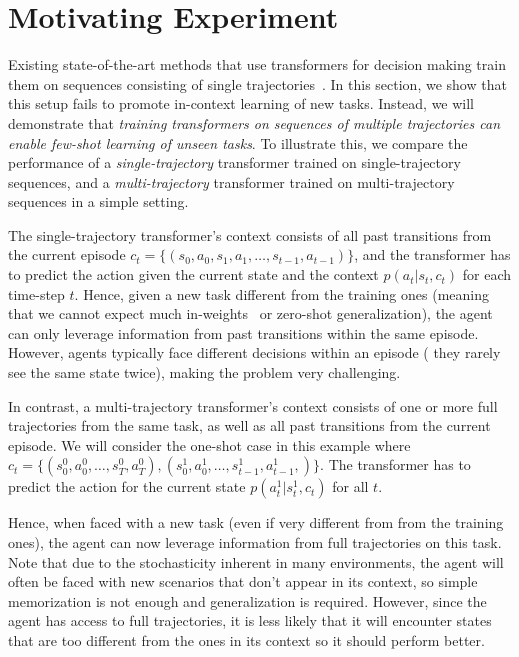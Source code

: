 \section{Motivating Experiment}

Existing state-of-the-art methods that use transformers for decision making train them on sequences consisting of single trajectories~\citep{decision_transformer}. In this section, we show that this setup fails to promote in-context learning of new tasks. Instead, we will demonstrate that \textit{training transformers on sequences of multiple trajectories can enable few-shot learning of unseen tasks}. To illustrate this, we compare the performance of a \textit{single-trajectory} transformer trained on single-trajectory sequences, and a \textit{multi-trajectory} transformer trained on multi-trajectory sequences in a simple setting. 

The single-trajectory transformer's context consists of all past transitions from the current episode $c_t = \{(s_0, a_0, s_1, a_1, \ldots, s_{t-1}, a_{t-1})\}$, and the transformer has to predict the action given the current state and the context $p(a_t | s_t, c_t)$ for each time-step $t$. Hence, given a new task different from the training ones (meaning that we cannot expect much in-weights~\citep{chen2022transdreamer} or zero-shot generalization), the agent can only leverage information from past transitions within the same episode. However, agents typically face different decisions within an episode (\ie{} they rarely see the same state twice), making the problem very challenging.

In contrast, a multi-trajectory transformer's context consists of one or more full trajectories from the same task, as well as all past transitions from the current episode. We will consider the one-shot case in this example where $c_t = \{(s_0^0, a_0^0, \ldots, s_{T}^0, a_{T}^0), (s_0^1, a_0^1, \ldots, s_{t-1}^1, a_{t-1}^1, )\}$. The transformer has to predict the action for the current state $p(a_t^1 | s_t^1, c_t)$ for all $t$.

Hence, when faced with a new task (even if very different from from the training ones), the agent can now leverage information from full trajectories on this task. Note that due to the stochasticity inherent in many environments,  the agent will often be faced with new scenarios that don't appear in its context, so simple memorization is not enough and generalization is required. 
However, since the agent has access to full trajectories, it is less likely that it will encounter states that are too different from the ones in its context so it should perform better.

